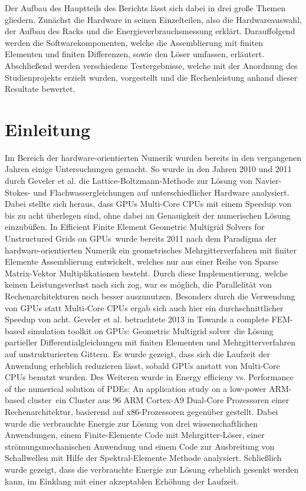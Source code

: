 Der Aufbau des Hauptteils des Berichts lässt sich dabei in drei große Themen gliedern. Zunächst die Hardware in seinen Einzelteilen, also die Hardwareauswahl, der Aufbau des Racks und die Energieverbrauchsmessung erklärt. Darauffolgend werden die Softwarekomponenten, welche die Assemblierung mit finiten Elementen und finiten Differenzen, sowie den Löser umfassen, erläutert. Abschließend werden verschiedene Testergebnisse, welche mit der Anordnung des Studienprojekts erzielt wurden, vorgestellt und die Rechenleistung anhand dieser Resultate bewertet. 



\section{Einleitung}


Im Bereich der hardware-orientierten Numerik wurden bereits in den vergangenen Jahren einige Untersuchungen gemacht. So wurde in den Jahren 2010 und 2011 durch Geveler et al. die Lattice-Boltzmann-Methode zur Lösung von Navier-Stokes- und Flachwassergleichungen auf unterschiedlicher Hardware analysiert. Dabei stellte sich heraus, dass GPUs Multi-Core CPUs mit einem Speedup von bis zu acht überlegen sind, ohne dabei an Genauigkeit der numerischen Lösung einzubü\ss en. 
In \glqq Efficient Finite Element Geometric Multigrid Solvers for Unstructured Grids on GPUs\grqq\, wurde bereits 2011 nach dem Paradigma der hardware-orientierten Numerik ein geometrisches Mehrgitterverfahren mit finiter Elemente Assemblierung entwickelt, welches nur aus einer Reihe von Sparse Matrix-Vektor Multiplikationen besteht. Durch diese Implementierung, welche keinen Leistungsverlust nach sich zog, war es möglich, die Parallelität von Rechenarchitekturen noch besser auszunutzen. Besonders durch die Verwendung von GPUs statt Multi-Core CPUs ergab sich auch hier ein durchschnittlicher Speedup von acht.
Geveler et al. betrachtete 2013 in \glqq 
Towards a complete FEM-based simulation toolkit on GPUs: Geometric Multigrid solver\grqq\, die Lösung partieller Differentialgleichungen mit finiten Elementen und Mehrgitterverfahren auf unstrukturierten Gittern. Es wurde gezeigt, dass sich die Laufzeit der Anwendung erheblich reduzieren lässt, sobald GPUs anstatt von Multi-Core CPUs benutzt wurden. 
Des Weiteren wurde in \glqq Energy efficieny vs. Performance of the numerical solution of PDEs: An application study on a low-power ARM-based cluster\grqq\, ein Cluster aus 96 ARM Cortex-A9 Dual-Core Prozessoren einer Rechenarchitektur, basierend auf x86-Prozessoren gegenüber gestellt. Dabei wurde die verbrauchte Energie zur Lösung von drei wissenschaftlichen Anwendungen, einem Finite-Elemente Code mit Mehrgitter-Löser, einer strömungsmechanischen Anwendung und einem Code zur Ausbreitung von Schallwellen mit Hilfe der Spektral-Elemente Methode analysiert. Schließlich wurde gezeigt, dass die verbrauchte Energie zur Lösung erheblich gesenkt werden kann, im Einklang mit einer akzeptablen Erhöhung der Laufzeit. 

